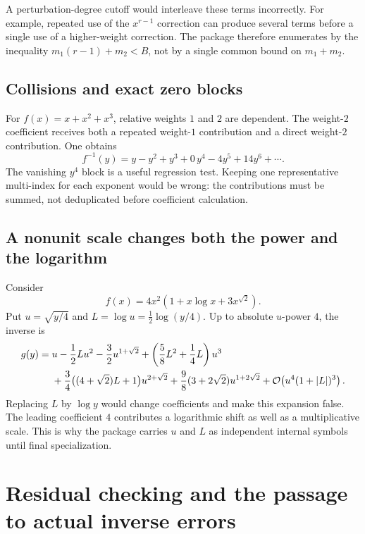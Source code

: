\documentclass[11pt,a4paper]{article}
\numberwithin{equation}{section}
\theoremstyle{definition}
\theoremstyle{remark}
\newcommand{\OO}{\mathcal O}
\begin{document}
A perturbation-degree cutoff would interleave these terms incorrectly.
For example, repeated use of the $x^{r-1}$ correction can produce several
terms before a single use of a higher-weight correction. The package
therefore enumerates by the inequality
$m_1(r-1)+m_2<B$, not by a single common bound on $m_1+m_2$.

\subsection{Collisions and exact zero blocks}

For $f(x)=x+x^2+x^3$, relative weights $1$ and $2$ are dependent.
The weight-$2$ coefficient receives both a repeated weight-$1$
contribution and a direct weight-$2$ contribution. One obtains
\[
 f^{-1}(y)=y-y^2+y^3+0\,y^4-4y^5+14y^6+\cdots.
\]
The vanishing $y^4$ block is a useful regression test. Keeping one
representative multi-index for each exponent would be wrong: the
contributions must be summed, not deduplicated before coefficient
calculation.

\subsection{A nonunit scale changes both the power and the logarithm}

Consider
\begin{equation}\label{eq:p2example}
 f(x)=4x^2\left(1+x\log x+3x^{\sqrt2}\right).
\end{equation}
Put $u=\sqrt{y/4}$ and $L=\log u=\tfrac12\log(y/4)$. Up to absolute
$u$-power $4$, the inverse is
\begin{align}\label{eq:p2answer}
 g(y)={}&u-\frac12L u^2-\frac32u^{1+\sqrt2}
 +\left(\frac58L^2+\frac14L\right)u^3\notag\\
 &+\frac34\bigl((4+\sqrt2)L+1\bigr)u^{2+\sqrt2}
 +\frac98(3+2\sqrt2)u^{1+2\sqrt2}
 +\OO\!\left(u^4(1+|L|)^3\right).
\end{align}
Replacing $L$ by $\log y$ would change coefficients and make this
expansion false. The leading coefficient $4$ contributes a logarithmic
shift as well as a multiplicative scale. This is why the package carries
$u$ and $L$ as independent internal symbols until final specialization.

\section{Residual checking and the passage to actual inverse errors}
\label{sec:residual}
\end{document}
